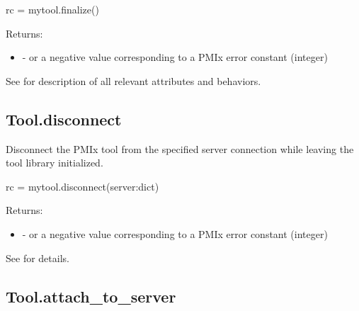 \format

\pyspecificstart
\begin{codepar}
rc = mytool.finalize()
\end{codepar}
\pyspecificend


Returns:

\begin{itemize}
    \item {} -  or a negative value corresponding to a PMIx error constant (integer)
\end{itemize}


See  for description of all relevant attributes and behaviors.


\subsection{Tool.disconnect}

\summary

Disconnect the \ac{PMIx} tool from the specified server connection while leaving the tool library initialized.

\format

\pyspecificstart
\begin{codepar}
rc = mytool.disconnect(server:dict)
\end{codepar}
\pyspecificend

\begin{arglist}
\end{arglist}

Returns:

\begin{itemize}
    \item {} -  or a negative value corresponding to a PMIx error constant (integer)
\end{itemize}

See  for details.


\subsection{Tool.attach_to_server}

